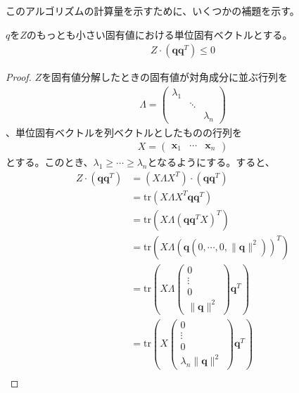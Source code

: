 このアルゴリズムの計算量を示すために、いくつかの補題を示す。
\begin{lemma*}
  $q$を$Z$のもっとも小さい固有値における単位固有ベクトルとする。
  \begin{align*}
    Z \cdot (\mathbf{q} \mathbf{q}^T) \leq 0
  \end{align*}
\end{lemma*}
\begin{proof}
  $Z$を固有値分解したときの固有値が対角成分に並ぶ行列を
  \begin{align*}
    \Lambda = \left(
                \begin{array}{ccc}
                  \lambda_1 &        & \\
                            & \ddots & \\
                            &        & \lambda_n
                \end{array}
              \right)
  \end{align*}
  、単位固有ベクトルを列ベクトルとしたものの行列を
  \begin{align*}
    X = \left(
          \begin{array}{ccc}
            \mathbf{x}_1 & \cdots & \mathbf{x}_n
          \end{array}
        \right)
  \end{align*}
  とする。このとき、$\lambda_1 \geq \cdots \geq \lambda_n$となるようにする。すると、
  \begin{align*}
    Z \cdot (\mathbf{q} \mathbf{q}^T) & = (X \Lambda X^T) \cdot (\mathbf{q} \mathbf{q}^T) \\
                                      & = \mathrm{tr}(X \Lambda X^T \mathbf{q} \mathbf{q}^T) \\
                                      & = \mathrm{tr}(X \Lambda (\mathbf{q} \mathbf{q}^T X)^T) \\
                                      & = \mathrm{tr}(X \Lambda (\mathbf{q} \left(0, \cdots, 0, \|\mathbf{q}\|^2\right))^T) \\
                                      & = \mathrm{tr}(X \Lambda \left(\begin{array}{c} 0 \\ \vdots \\ 0 \\ \|\mathbf{q}\|^2 \end{array}\right) \mathbf{q}^T) \\
                                      & = \mathrm{tr}(X \left(\begin{array}{c} 0 \\ \vdots \\ 0 \\ \lambda_n \|\mathbf{q}\|^2 \end{array}\right) \mathbf{q}^T) \\

\end{align*}
\end{proof}
